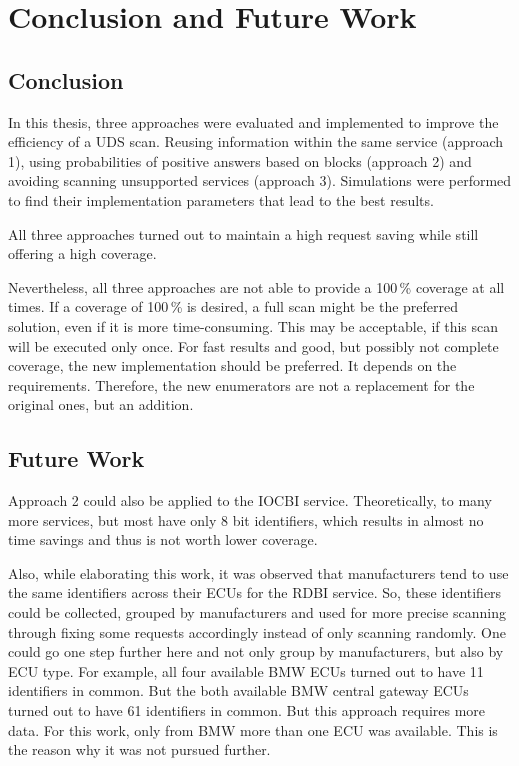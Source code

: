 \chapter{Conclusion and Future Work}

\section{Conclusion}

In this thesis, three approaches were evaluated and implemented to improve the efficiency of a UDS scan. 
Reusing information within the same service (approach 1), using probabilities of positive answers based on blocks (approach 2) and avoiding scanning unsupported services (approach 3). Simulations were performed to find their implementation parameters that lead to the best results.

All three approaches turned out to maintain a high request saving while still offering a high coverage.

Nevertheless, all three approaches are not able to provide a 100\,\% coverage at all times. 
If a coverage of 100\,\% is desired, a full scan might be the preferred solution, even if it is more time-consuming. 
This may be acceptable, if this scan will be executed only once. 
For fast results and good, but possibly not complete coverage, the new implementation should be preferred. It depends on the requirements. Therefore, the new enumerators are not a replacement for the original ones, but an addition.

\section{Future Work}

Approach 2 could also be applied to the IOCBI service. 
Theoretically, to many more services, but most have only 8 bit identifiers, which results in almost no time savings and thus is not worth lower coverage.

Also, while elaborating this work, it was observed that manufacturers tend to use the same identifiers across their ECUs for the RDBI service. 
So, these identifiers could be collected, grouped by manufacturers and used for more precise scanning through fixing some requests accordingly instead of only scanning randomly. 
One could go one step further here and not only group by manufacturers, but also by ECU type.
For example, all four available BMW ECUs turned out to have 11 identifiers in common. 
But the both available BMW central gateway ECUs turned out to have 61 identifiers in common. But this approach requires more data. For this work, only from BMW more than one ECU was available. This is the reason why it was not pursued further.

